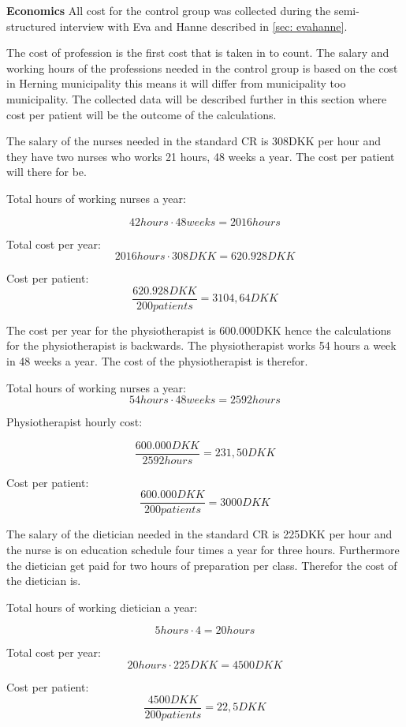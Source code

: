 \textbf{Economics}
All cost for the control group was collected during the semi-structured interview with Eva and Hanne described in \cref{sec: evahanne}. 

The cost of profession is the first cost that is taken in to count.
The salary and working hours of the professions needed in the control group is based on the cost in Herning municipality this means it will differ from municipality too municipality. The collected data will be described further in this section where cost per patient will be the outcome of the calculations. 


The salary of the nurses needed in the standard CR is 308DKK per hour and they have two nurses who works 21 hours, 48 weeks a year. The cost per patient will there for be.

Total hours of working nurses a year:

$$42hours\cdot48weeks=2016hours$$

Total cost per year:
$$2016hours\cdot308DKK=620.928DKK$$

Cost per patient:
$$\frac{620.928DKK}{200patients}=3104,64DKK$$

The cost per year for the physiotherapist is 600.000DKK hence the calculations for the physiotherapist is backwards. The physiotherapist works 54 hours a week in 48 weeks a year. The cost of the physiotherapist is therefor.

Total hours of working nurses a year:
$$54hours\cdot48weeks=2592hours$$

Physiotherapist hourly cost:

$$\frac{600.000DKK}{2592hours}=231,50DKK$$

Cost per patient:
$$\frac{600.000DKK}{200patients}=3000DKK$$

The salary of the dietician needed in the standard CR is 225DKK per hour and the nurse is on education schedule four times a year for three hours. Furthermore the dietician get paid for two hours of preparation per class.  Therefor the cost of the dietician is.

Total hours of working dietician a year:

$$5hours\cdot4=20hours$$

Total cost per year:
$$20hours\cdot225DKK=4500DKK$$

Cost per patient:
$$\frac{4500DKK}{200patients}=22,5DKK$$

